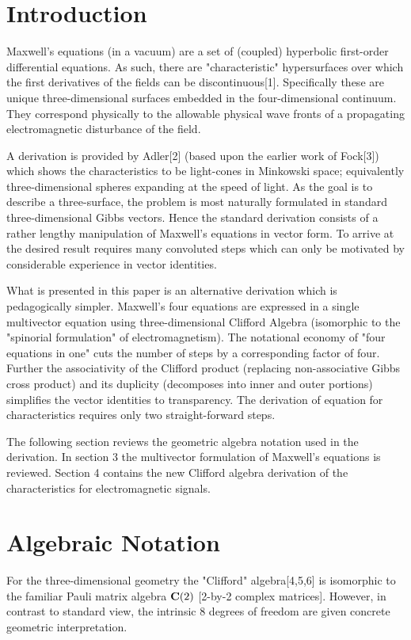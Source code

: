 \section{Introduction}
\quad Maxwell's equations (in a vacuum) are a set of (coupled) hyperbolic
 first-order differential equations.  As such, there are "characteristic"
 hypersurfaces over which the first derivatives of the fields can be
 discontinuous[1].  Specifically these are unique three-dimensional surfaces
 embedded in the four-dimensional continuum.  They correspond physically to
 the allowable physical wave fronts of a propagating electromagnetic
 disturbance of the field.

A derivation is provided by Adler[2] (based upon the earlier work of Fock[3])
 which shows the characteristics to be light-cones in Minkowski space;
 equivalently three-dimensional spheres expanding at the speed of light.
As the goal is to describe a three-surface, the problem is most naturally
 formulated in standard three-dimensional Gibbs vectors.  Hence the standard
 derivation consists of a rather lengthy manipulation of Maxwell's equations
 in vector form.  To arrive at the desired result requires many convoluted
 steps which can only be motivated by considerable experience in vector
 identities.

What is presented in this paper is an alternative derivation which is
 pedagogically simpler.  Maxwell's four equations are expressed in a single
 multivector equation using three-dimensional Clifford Algebra (isomorphic
 to the "spinorial formulation" of electromagnetism).  The notational
 economy of "four equations in one" cuts the number of steps by a
 corresponding factor of four.  Further the associativity of the Clifford
 product (replacing non-associative Gibbs cross product) and its duplicity
 (decomposes into inner and outer portions) simplifies the vector identities
 to transparency.  The derivation of equation for characteristics requires
 only two straight-forward steps.

The following section reviews the geometric algebra notation used in the
 derivation.  In section 3 the multivector formulation of Maxwell's equations
 is reviewed.  Section 4 contains the new Clifford algebra derivation of the
 characteristics for electromagnetic signals.

\section{Algebraic Notation}
\quad For the three-dimensional geometry the "Clifford" algebra[4,5,6] is
 isomorphic to the familiar Pauli matrix algebra ${\bf C}(2)$ [2-by-2
 complex matrices].  However, in contrast to standard view, the intrinsic
 8 degrees of freedom are given concrete geometric interpretation.

